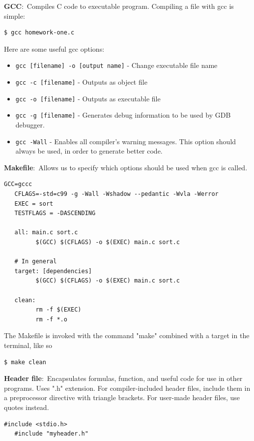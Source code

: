 \documentclass[nobib]{tufte-handout}
\newcommand{\defn}[2]{\noindent\textbf{#1}:\ #2}
\begin{document}
\defn{GCC}{Compiles C code to executable program.}
Compiling a file with gcc is simple:
\begin{lstlisting}[language=bash,caption=Using gcc]
   $ gcc homework-one.c
\end{lstlisting}
Here are some useful gcc options:
\begin{itemize}
   \item \texttt{gcc [filename] -o [output name]} - Change executable file name
   \item \texttt{gcc -c [filename]} - Outputs as object file
   \item \texttt{gcc -o [filename]} - Outputs as executable file
   \item \texttt{gcc -g [filename]} - Generates debug information to be used by GDB debugger.
   \item \texttt{gcc -Wall} - Enables all compiler's warning messages. This option should always be used, in order to generate better code.
\end{itemize}




\defn{Makefile}{Allows us to specify which options should be
used when gcc is called.}
\begin{lstlisting}[caption=Makefile]
   GCC=gccc
   CFLAGS=-std=c99 -g -Wall -Wshadow --pedantic -Wvla -Werror
   EXEC = sort
   TESTFLAGS = -DASCENDING

   all: main.c sort.c
         $(GCC) $(CFLAGS) -o $(EXEC) main.c sort.c

   # In general
   target: [dependencies]
         $(GCC) $(CFLAGS) -o $(EXEC) main.c sort.c

   clean:
         rm -f $(EXEC)
         rm -f *.o
\end{lstlisting}
The Makefile is invoked with the command "make" 
combined with a target in the terminal, like so
\begin{lstlisting}[caption=make clean]
   $ make clean
\end{lstlisting}

\defn{Header file}{Encapsulates formulas, function, and 
useful code for use in other programs. Uses ".h" extension.} For
compiler-included header files, include them in a preprocessor
directive with triangle brackets. For user-made header files,
use quotes instead. 
\begin{lstlisting}[caption=Header file usage]
   #include <stdio.h>
   #include "myheader.h"
\end{lstlisting}
\end{document}
